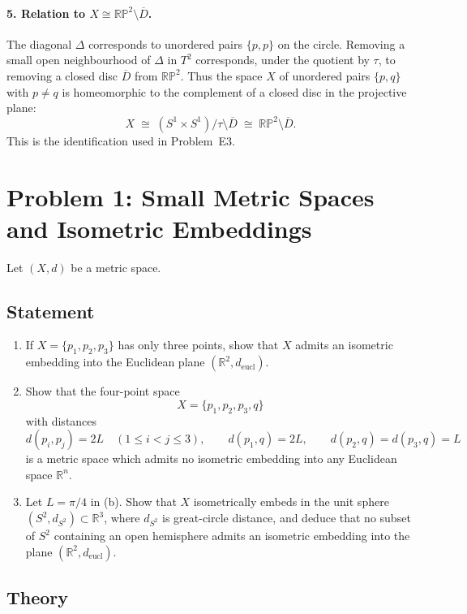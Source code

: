 \documentclass[12pt,a4paper]{article}
\theoremstyle{plain}
\theoremstyle{definition}      %
\begin{document}
	\paragraph{5. Relation to $X \cong \mathbb{RP}^{2}\setminus\overline{D}$.}
	The diagonal $\Delta$ corresponds to unordered pairs $\{p,p\}$ on the circle.
	Removing a small open neighbourhood of $\Delta$ in $T^{2}$ corresponds, under
	the quotient by $\tau$, to removing a closed disc $\overline{D}$ from
	$\mathbb{RP}^{2}$.  Thus the space $X$ of unordered pairs $\{p,q\}$ with
	$p\neq q$ is homeomorphic to the complement of a closed disc in the projective
	plane:
	\[
	X \;\cong\; (S^{1}\times S^{1})/\tau \setminus \overline{D}
	\;\cong\; \mathbb{RP}^{2}\setminus \overline{D}.
	\]
	This is the identification used in Problem~E3.
	
	
	\section*{Problem 1: Small Metric Spaces and Isometric Embeddings}
	
	Let $(X,d)$ be a metric space.
	
	\subsection*{Statement}
	
	\begin{enumerate}[label=\textnormal{(\alph*)}]
		\item If $X=\{p_1,p_2,p_3\}$ has only three points, show that $X$ admits an
		isometric embedding into the Euclidean plane $(\mathbb{R}^2,d_{\mathrm{eucl}})$.
		
		\item Show that the four-point space
		\[
		X=\{p_1,p_2,p_3,q\}
		\]
		with distances
		\[
		d(p_i,p_j)=2L \quad(1\le i<j\le 3),\qquad
		d(p_1,q)=2L,\qquad d(p_2,q)=d(p_3,q)=L
		\]
		is a metric space which admits no isometric embedding into any Euclidean
		space $\mathbb{R}^n$.
		
		\item Let $L=\pi/4$ in \textnormal{(b)}.  Show that $X$ isometrically embeds
		in the unit sphere $(S^2,d_{S^2})\subset\mathbb{R}^3$, where $d_{S^2}$ is
		great-circle distance, and deduce that no subset of $S^2$ containing an open
		hemisphere admits an isometric embedding into the plane
		$(\mathbb{R}^2,d_{\mathrm{eucl}})$.
	\end{enumerate}
	
	\subsection*{Theory}
	
\end{document}
